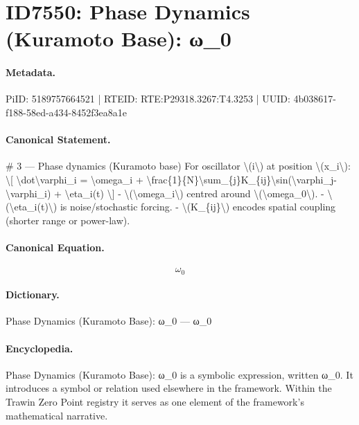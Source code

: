 \section*{ID7550: Phase Dynamics (Kuramoto Base): ω\_0}
\paragraph{Metadata.}
PiID: 5189757664521 | RTEID: RTE:P29318.3267:T4.3253 | UUID: 4b038617-f188-58ed-a434-8452f3ea8a1e

\paragraph{Canonical Statement.}
\# 3 — Phase dynamics (Kuramoto base) For oscillator \textbackslash{}(i\textbackslash{}) at position \textbackslash{}(x\_i\textbackslash{}): \textbackslash{}[ \textbackslash{}dot\textbackslash{}varphi\_i = \textbackslash{}omega\_i + \textbackslash{}frac\{1\}\{N\}\textbackslash{}sum\_\{j\}K\_\{ij\}\textbackslash{}sin(\textbackslash{}varphi\_j-\textbackslash{}varphi\_i) + \textbackslash{}eta\_i(t) \textbackslash{}] - \textbackslash{}(\textbackslash{}omega\_i\textbackslash{}) centred around \textbackslash{}(\textbackslash{}omega\_0\textbackslash{}). - \textbackslash{}(\textbackslash{}eta\_i(t)\textbackslash{}) is noise/stochastic forcing. - \textbackslash{}(K\_\{ij\}\textbackslash{}) encodes spatial coupling (shorter range or power-law).

\paragraph{Canonical Equation.}
\[
\omega_0
\]

\paragraph{Dictionary.}
Phase Dynamics (Kuramoto Base): ω\_0 — ω\_0

\paragraph{Encyclopedia.}
Phase Dynamics (Kuramoto Base): ω\_0 is a symbolic expression, written ω\_0. It introduces a symbol or relation used elsewhere in the framework. Within the Trawin Zero Point registry it serves as one element of the framework's mathematical narrative.
